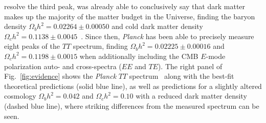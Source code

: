 resolve the third peak, was already able to conclusively say that dark matter makes up the majority of the matter budget in the Universe, finding the baryon density $\Omega_b h^2=0.02264\pm0.00050$ and cold dark matter density $\Omega_c h^2=0.1138\pm0.0045$~\cite{2013ApJS..208...19H}. Since then, \emph{Planck} has been able to precisely measure eight peaks of the $TT$ spectrum, finding $\Omega_b h^2= 0.02225\pm0.00016$ and $\Omega_c h^2=0.1198\pm0.0015$ when additionally including the CMB $E$-mode polarization auto- and cross-spectra ($EE$ and $TE$). The right panel of Fig.~\ref{fig:evidence} shows the \emph{Planck} $TT$ spectrum~\cite{Ade:2015xua} along with the best-fit theoretical predictions (solid blue line), as well as predictions for a slightly altered cosmology $\Omega_b h^2= 0.042$ and $\Omega_c h^2=0.10$ with a reduced dark matter density (dashed blue line), where striking differences from the measured spectrum can be seen.

